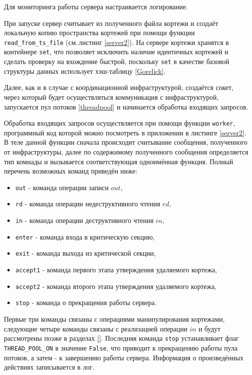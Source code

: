 Для мониторинга работы сервера настраивается логирование.

При запуске сервер считывает из полученного файла кортежи и создаёт локальную копию пространства кортежей при помощи функции \texttt{read_from_ts_file} (см.\,листинг \ref{server2}). На сервере кортежи хранятся в контейнере \texttt{set}, что позволяет исключить наличие идентичных кортежей и сделать проверку на вхождение быстрой, поскольку \texttt{set} в качестве базовой структуры данных использует хэш-таблицу \ref{Gorelick}.

Далее, как и в случае с координационной инфраструктурой, создаётся сокет, через который будет осуществляться коммуникация с инфраструктурой, запускается пул потоков \ref{threadpool} и начинается обработка входящих запросов.

Обработка входящих запросов осуществляется при помощи функции \texttt{worker}, программный код которой можно посмотреть в приложении в листинге \ref{server2}. В теле данной функции сначала происходит считывание сообщения, полученного от инфраструктуры, далее по содержимому полученного сообщения определяется тип комнады и вызывается соответствующая одноимённая функция. Полный перечень возможных команд приведён ниже:
\begin{itemize}
	\item \texttt{out} - команда операции записи $out$,
	\item \texttt{rd} - команда операции недеструктивного чтения $rd$,
	\item \texttt{in} - команда операции деструктивного чтения $in$,
	\item \texttt{enter} - команда входа в критическую секцию,
	\item \texttt{exit} - команда выхода из критической секции,
	\item \texttt{accept1} - команда первого этапа утверждения удаляемого кортежа,
	\item \texttt{accept2} - команда второго этапа утверждения удаляемого кортежа,
	\item \texttt{stop} - команда о прекращения работы сервера.
\end{itemize}
Первые три команды связаны с операциями манипулирования кортежами, следующие четыре команды связаны с реализацией операции $in$ и будут рассмотрены позже в разделах \ref{}. Последняя команда \texttt{stop} устанавливает флаг \texttt{THREAD_POOL_ON} в значение \texttt{False}, что приводит к прекращению работы пула потоков, а затем - к завершению работы сервера. Информация о произведённых действиях записывается в лог.


